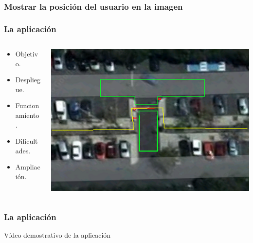 \begin{frame}
	\frametitle{Mostrar la posición del usuario en la imagen}
	
\end{frame}

\begin{frame}
	\frametitle{La aplicación \ULLAR{}}
	\begin{columns}
		\begin{column}{0.6\textwidth}
			\begin{itemize}
				\item Objetivo.
				\item Despliegue.
				\item Funcionamiento.
				\item Dificultades.
				\item Ampliación.
			\end{itemize}
			\endblock{}
		\end{column}
		\begin{column}{0.4\textwidth}
			\vfill 
			\begin{center}
				\includegraphics[width=0.9\linewidth]{Images/parking}
			\end{center}
		\end{column}
	\end{columns}
\end{frame}


\begin{frame}
	\frametitle{La aplicación \ULLAR{}}
		Vídeo demostrativo de la aplicación \ULLAR{}
\end{frame}